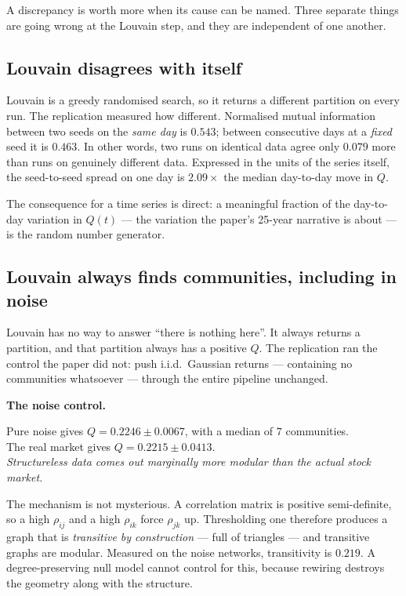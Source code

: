 \documentclass[11pt,a4paper]{article}
\newcommand{\Q}{Q}
\newenvironment{aside}[1]
 {\par\vspace{2.5mm}\begin{lrbox}{\asidebox}%
  \begin{minipage}{\dimexpr\textwidth-16pt\relax}\small\textbf{#1}\par\vspace{1mm}}
 {\end{minipage}\end{lrbox}%
  \noindent\setlength{\fboxsep}{7pt}\setlength{\fboxrule}{.4pt}%
  \fcolorbox{Rule}{Panel2}{\usebox{\asidebox}}\par\vspace{2.5mm}}
\begin{document}
A discrepancy is worth more when its cause can be named. Three separate things
are going wrong at the Louvain step, and they are independent of one another.

\subsection{Louvain disagrees with itself}

Louvain is a greedy randomised search, so it returns a different partition on
every run. The replication measured how different. Normalised mutual information
between two seeds on the \emph{same day} is $0.543$; between consecutive days at
a \emph{fixed} seed it is $0.463$. In other words, two runs on identical data
agree only $0.079$ more than runs on genuinely different data. Expressed in the
units of the series itself, the seed-to-seed spread on one day is
$\mathbf{2.09\times}$ the median day-to-day move in $\Q$.

The consequence for a time series is direct: a meaningful fraction of the
day-to-day variation in $\Q(t)$ --- the variation the paper's 25-year narrative
is about --- is the random number generator.

\subsection{Louvain always finds communities, including in noise}

Louvain has no way to answer ``there is nothing here''. It always returns a
partition, and that partition always has a positive $\Q$. The replication ran
the control the paper did not: push i.i.d.\ Gaussian returns --- containing no
communities whatsoever --- through the entire pipeline unchanged.

\begin{aside}{The noise control.}
Pure noise gives $\Q = 0.2246\pm0.0067$, with a median of $7$ communities.\\
The real market gives $\Q = 0.2215\pm0.0413$.\\[2mm]
\emph{Structureless data comes out marginally more modular than the actual stock
market.}
\end{aside}

\noindent The mechanism is not mysterious. A correlation matrix is positive
semi-definite, so a high $\rho_{ij}$ and a high $\rho_{ik}$ force $\rho_{jk}$
up. Thresholding one therefore produces a graph that is \emph{transitive by
construction} --- full of triangles --- and transitive graphs are modular.
Measured on the noise networks, transitivity is $0.219$. A degree-preserving
null model cannot control for this, because rewiring destroys the geometry along
with the structure.
\end{document}
